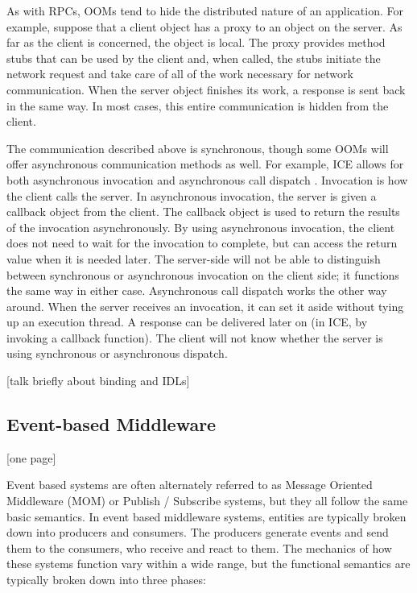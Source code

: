 \documentclass{acm_proc_article-sp}
\begin{document}
As with RPCs, OOMs tend to hide the distributed nature of an application.  For example, suppose that a client object has a proxy to an object on the server.  As far as the client is concerned, the object is local.  The proxy provides method stubs that can be used by the client and, when called, the stubs initiate the network request and take care of all of the work necessary for network communication.  When the server object finishes its work, a response is sent back in the same way.  In most cases, this entire communication is hidden from the client.

The communication described above is synchronous, though some OOMs will offer asynchronous communication methods as well.  For example, ICE allows for both asynchronous invocation and asynchronous call dispatch \cite{Henning:2004p8372}.  Invocation is how the client calls the server.  In asynchronous invocation, the server is given a callback object from the client.  The callback object is used to return the results of the invocation asynchronously.  By using asynchronous invocation, the client does not need to wait for the invocation to complete, but can access the return value when it is needed later.  The server-side will not be able to distinguish between synchronous or asynchronous invocation on the client side; it functions the same way in either case.  Asynchronous call dispatch works the other way around.  When the server receives an invocation, it can set it aside without tying up an execution thread.  A response can be delivered later on (in ICE, by invoking a callback function).  The client will not know whether the server is using synchronous or asynchronous dispatch.

[talk briefly about binding and IDLs]




\subsection{Event-based Middleware}

[one page]

Event based systems are often alternately referred to as Message Oriented Middleware (MOM) or Publish / Subscribe systems, but they all follow the same basic semantics. In event based middleware systems, entities are typically broken down into producers and consumers. The producers generate events and send them to the consumers, who receive and react to them. The mechanics of how these systems function vary within a wide range, but the functional semantics are typically broken down into three phases:
\end{document}
